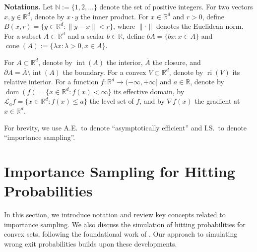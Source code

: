 \documentclass[aap,preprint]{imsart}
\newcommand{\bN}{\mathbb{N}}
\newcommand{\bR}{{\mathbb{R}}}
\theoremstyle{plain}
\theoremstyle{definition}
\begin{document}
\smallskip
\noindent \textbf{Notations.} 
Let $\bN := \{1, 2, \ldots\}$ denote the set of positive integers. 
For two vectors $x,y \in \bR^d$, denote by  $x \cdot y$ the inner product. For $x \in \bR^d$ and $r >0$, define $B(x,r) = \{y \in \bR^d: \|y-x\| < r\}$, where $\|\cdot\|$ denotes the Euclidean norm. For a subset  $A \subset \bR^d$ and a scalar $b \in \bR$, define $b A =\{bx : x \in A\}$ and  $\operatorname{cone}(A)  :=  \{\lambda x: \lambda > 0, x \in A\}$. 

For $A \subset \bR^d$, denote by $\operatorname{int}(A)$ the interior, $\overline{A}$ the closure, and $\partial A = \overline{A} \setminus \operatorname{int}(A)$ the boundary. For a convex $V \subset \bR^d$, denote by $\operatorname{ri}(V)$ its relative interior. 
For a function $f: \bR^d \to (-\infty, +\infty]$ and $a \in \bR$, denote by 
$\operatorname{dom}(f) = \{x \in \bR^d: f(x) < \infty\}$ its effective domain, 
by $\mathcal{L}_a f = \{x \in \bR^d: f(x) \leq a\}$ the level set of $f$, and 
by $\nabla f(x)$ the gradient at $x \in \bR^d$.

For brevity, we use A.E.~to denote ``asymptotically efficient'' and I.S.~to denote ``importance sampling''.

 
 
 \section{Importance Sampling  for  Hitting Probabilities}\label{sec:preliminary}
In this section, we introduce notation and review key concepts related to importance sampling. We also discuss the simulation of hitting probabilities for convex sets, following the foundational work of \cite{collamore1996, collamore_thesis, collamore2002}. Our approach to simulating wrong exit probabilities builds upon these developments.
\end{document}
